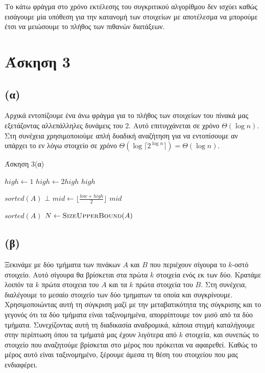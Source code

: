 \documentclass[11pt,a4paper]{book}
\begin{document}
Το κάτω φράγμα στο χρόνο εκτέλεσης του συγκριτικού αλγορίθμου δεν ισχύει καθώς εισάγουμε μία υπόθεση για την κατανομή των στοιχείων με αποτέλεσμα να μπορούμε έτσι να μειώσουμε το πλήθος των πιθανών διατάξεων.

\section*{Άσκηση 3}

\subsection*{(α)}
Αρχικά εντοπίζουμε ένα άνω φράγμα για το πλήθος των στοιχείων του πίνακά μας εξετάζοντας αλλεπάλληλες δυνάμεις του 2. Αυτό επιτυγχάνεται σε χρόνο $\Theta( \log n )$. Στη συνέχεια χρησιμοποιούμε απλή δυαδική αναζήτηση για να εντοπίσουμε αν υπάρχει το εν λόγω στοιχείο σε χρόνο $\Theta( \log \lceil 2^{\log n} \rceil ) = \Theta( \log n )$.

\begin{algorithm}[H]
\caption{\textgreek{Άσκηση 3(α)}}
\begin{algorithmic}[1]
    \State $high \gets 1$
        \State $high \gets 2high$
    \EndWhile
    \State \Return $high$
\EndProcedure

\Require $sorted(A)$
    	\State \Return $\bot$
    \EndIf
    \State $mid \gets \lfloor \frac{low + high}{2} \rfloor$
        \State \Return $mid$
    \EndIf
        \State \Return {}
    \EndIf
        \State \Return {}
	\EndIf
\EndProcedure

\Require $sorted(A)$
	\State $N \gets \Call{SizeUpperBound}{A}$
    \State \Return 
\EndProcedure
\end{algorithmic}
\end{algorithm}
    
\subsection*{(β)}
Ξεκινάμε με δύο τμήματα των πινάκων $A$ και $B$ που περιέχουν σίγουρα το $k$-οστό στοιχείο. Αυτό σίγουρα θα βρίσκεται στα πρώτα $k$ στοιχεία ενός εκ των δύο. Κρατάμε λοιπόν τα $k$ πρώτα στοιχεια του $A$ και τα $k$ πρώτα στοιχεία του $B$. Στη συνέχεια, διαλέγουμε το μεσαίο στοιχείο των δύο τμηματων τα οποία και συγκρίνουμε. Χρησιμοποιώντας αυτή τη σύγκριση μαζί με την μεταβατικότητα της σύγκρισης και το γεγονός ότι τα δύο τμήματα είναι ταξινομημένα, απορρίπτουμε τον μισό από τα δύο τμήματα. Συνεχίζοντας αυτή τη διαδικασία αναδρομικά, κάποια στιγμή καταλήγουμε στην περίπτωση όπου τα τμήματά μας έχουν λιγότερα από $k$ στοιχεία, και συνεπώς το στοιχείο που αναζητούμε βρίσκεται στο μέρος που πρόκειται να αφαιρεθεί. Καθώς το μέρος αυτό είναι ταξινομημένο, ξέρουμε άμεσα τη θέση του στοιχείου που μας ενδιαφέρει.
\end{document}
